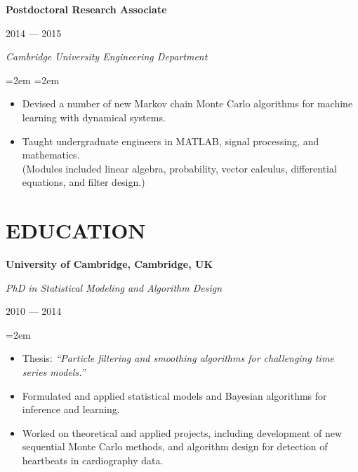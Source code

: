 \documentclass[letterpaper,10pt]{article}
\newcommand{\sepspace}{\vspace*{0.3em}}
\newcommand{\NewPart}[1]{\vspace{-1em} \section*{\uppercase{#1}}}
\newcommand{\MainHeading}[1]{\noindent\textbf{#1}}
\newcommand{\SubHeading}[1]{\noindent\textit{#1}}
\newcommand{\DateBox}[1]{\colorbox{light-gray}{\parbox{8em}{\hfill\color{White}#1}}}
\newcommand{\Details}[1]{\hangindent=2em\hangafter=0\small#1\normalsize\par}
\newcommand{\WorkEntry}[4]{%
                \MainHeading{#1} \hfill \DateBox{#2} \par
                \SubHeading{#3} \par
                \noindent \hangindent=2em \hangafter=0 \Details{#4} }
\newcommand{\EducationEntry}[3]{%
                \SubHeading{#1} \hfill \DateBox{#2} \par
                \Details{#3} }
\begin{document}
\WorkEntry{Postdoctoral Research Associate}{2014 --- 2015}{Cambridge University Engineering Department}{
\begin{itemize}
 \item Devised a number of new Markov chain Monte Carlo algorithms for machine learning with dynamical systems.
 \item Taught undergraduate engineers in MATLAB, signal processing, and mathematics. \\ (Modules included linear algebra, probability, vector calculus, differential equations, and filter design.)
\end{itemize}
}
\sepspace









\NewPart{Education}

\MainHeading{University of Cambridge, Cambridge, UK}

\EducationEntry{PhD in Statistical Modeling and Algorithm Design}{2010 --- 2014}{
\begin{itemize}
 \item Thesis: \textit{``Particle filtering and smoothing algorithms for challenging time series models.''}
 \item Formulated and applied statistical models and Bayesian algorithms for inference and learning.
 \item Worked on theoretical and applied projects, including development of new sequential Monte Carlo methods, and algorithm design for detection of heartbeats in cardiography data.
\end{itemize}
}
\sepspace
\end{document}
